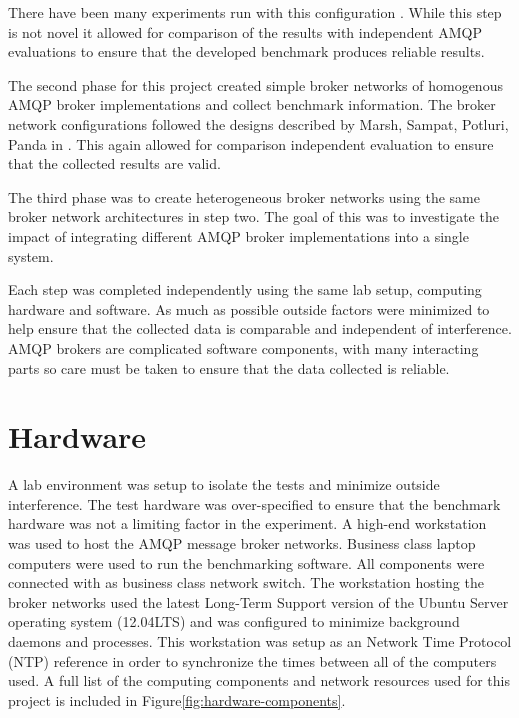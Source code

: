 \documentclass{thesis}
\begin{document}
There have been many experiments run with this configuration \cite{Chirino} \cite{Bayer}.  While this step is not novel it allowed for comparison of the results with independent AMQP evaluations to ensure that the developed benchmark produces reliable results. 

The second phase for this project created simple broker networks of homogenous AMQP broker implementations and collect benchmark information.  The broker network configurations followed the designs described by Marsh, Sampat, Potluri, Panda in \cite{marsh2010scaling}.  This again allowed for comparison independent evaluation to ensure that the collected results are valid.

The third phase was to create heterogeneous broker networks using the same broker network architectures in step two.  The goal of this was to investigate the impact of integrating different AMQP broker implementations into a single system.  

Each step was completed independently using the same lab setup, computing hardware and software.  As much as possible outside factors were minimized to help ensure that the collected data is comparable and independent of interference.  AMQP brokers are complicated software components, with many interacting parts so care must be taken to ensure that the data collected is reliable.  

\section{Hardware}
A lab environment was setup to isolate the tests and minimize outside interference.  The test hardware was over-specified to ensure that the benchmark hardware was not a limiting factor in the experiment.  A high-end workstation was used to host the AMQP message broker networks.  Business class laptop computers were used to run the benchmarking software.  All components were connected with as business class network switch.  The workstation hosting the broker networks used the latest Long-Term Support version of the Ubuntu Server operating system (12.04LTS) and was configured to minimize background daemons and processes.  This workstation was setup as an Network Time Protocol (NTP) reference in order to synchronize the times between all of the computers used.  A full list of the computing components and network resources used for this project is included in Figure\ref{fig:hardware-components}.
\end{document}
